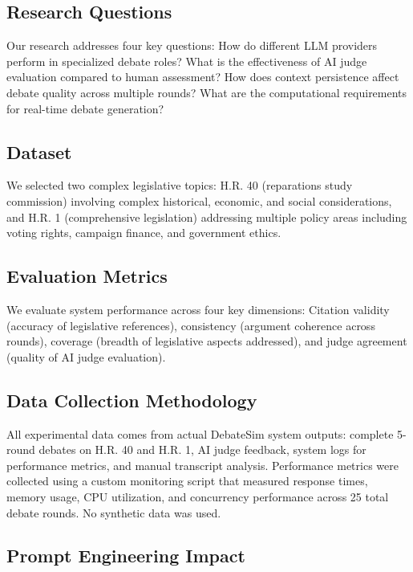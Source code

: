 \documentclass{article}
\begin{document}
\subsection{Research Questions}

Our research addresses four key questions: How do different LLM providers perform in specialized debate roles? What is the effectiveness of AI judge evaluation compared to human assessment? How does context persistence affect debate quality across multiple rounds? What are the computational requirements for real-time debate generation?

\subsection{Dataset}

We selected two complex legislative topics: H.R. 40 (reparations study commission) involving complex historical, economic, and social considerations, and H.R. 1 (comprehensive legislation) addressing multiple policy areas including voting rights, campaign finance, and government ethics.

\subsection{Evaluation Metrics}

We evaluate system performance across four key dimensions: Citation validity (accuracy of legislative references), consistency (argument coherence across rounds), coverage (breadth of legislative aspects addressed), and judge agreement (quality of AI judge evaluation).

\subsection{Data Collection Methodology}

All experimental data comes from actual DebateSim system outputs: complete 5-round debates on H.R. 40 and H.R. 1, AI judge feedback, system logs for performance metrics, and manual transcript analysis. Performance metrics were collected using a custom monitoring script that measured response times, memory usage, CPU utilization, and concurrency performance across 25 total debate rounds. No synthetic data was used.

\subsection{Prompt Engineering Impact}
\end{document}

